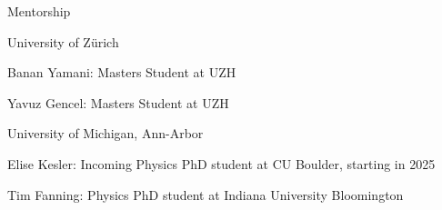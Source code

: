 \documentclass{resume} %
\begin{document}
\begin{rSection}{Mentorship}
\begin{rSubsection}{University of Zürich}{}{}{}
    \item Banan Yamani: Masters Student at UZH
    \item Yavuz Gencel: Masters Student at UZH
\end{rSubsection}

\begin{rSubsection}{University of Michigan, Ann-Arbor}{}{}{}
    \item Elise Kesler: Incoming Physics PhD student at CU Boulder, starting in 2025
    \item Tim Fanning: Physics PhD student at Indiana University Bloomington
\end{rSubsection}

\end{rSection}

%

\end{document}
